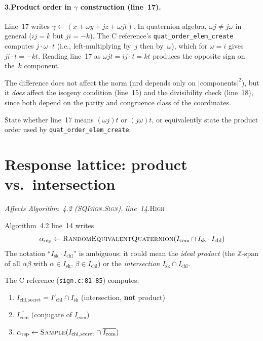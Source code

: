 \documentclass[a4paper,11pt]{article}
\newcommand{\algo}[1]{Algorithm~#1}
\newcommand{\high}{\textsc{\color{BurntOrange}High}}
\newcommand{\finding}[2]{\noindent\textit{#1}\hfill#2\par\smallskip}
\begin{document}
\paragraph{3.\enspace Product order in $\gamma$ construction
(line~17).}
Line~17 writes $\gamma \leftarrow (x + \omega y + jz + \omega jt)$.
In quaternion algebra, $\omega j \neq j\omega$ in general ($ij = k$
but $ji = -k$).  The C reference's
\texttt{quat\_order\_elem\_create} computes $j \cdot \omega \cdot t$
(i.e., left-multiplying by~$j$ then by~$\omega$), which for
$\omega = i$ gives $ji \cdot t = -kt$.  Reading line~17 as
$\omega j t = ij \cdot t = kt$ produces the opposite sign on
the~$k$ component.

The difference does not affect the norm ($\mathrm{nrd}$ depends only
on $|$components$|^2$), but it \emph{does} affect the isogeny
condition (line~15) and the divisibility check (line~18), since both
depend on the parity and congruence class of the coordinates.

State whether line~17 means $(\omega j)t$ or $(j\omega)t$, or
equivalently state the product order used by
\texttt{quat\_order\_elem\_create}.

\section{Response lattice: product vs.\ intersection}
\label{sec:response-lattice}

\finding{Affects \algo{4.2} (\textsc{SQIsign.Sign}),
line~14.}{\high}

\algo{4.2} line~14 writes
\[
  \alpha_{\mathrm{rsp}} \leftarrow
  \textsc{RandomEquivalentQuaternion}(
    \overline{I_{\mathrm{com}}} \cap I_{\mathrm{sk}} \cdot I_{\mathrm{chl}})
\]
The notation ``$I_{\mathrm{sk}} \cdot I_{\mathrm{chl}}$'' is
ambiguous: it could mean the \emph{ideal product} (the $\mathbb{Z}$-span
of all $\alpha\beta$ with $\alpha \in I_{\mathrm{sk}}$,
$\beta \in I_{\mathrm{chl}}$) or the \emph{intersection}
$I_{\mathrm{sk}} \cap I_{\mathrm{chl}}$.

The C reference (\texttt{sign.c:81--85}) computes:
\begin{enumerate}[nosep]
  \item $I_{\mathrm{chl,secret}} = I'_{\mathrm{chl}} \cap
        I_{\mathrm{sk}}$ \quad (intersection, \textbf{not} product)
  \item $\overline{I_{\mathrm{com}}}$ (conjugate of $I_{\mathrm{com}}$)
  \item $\alpha_{\mathrm{rsp}} \leftarrow
        \textsc{Sample}(I_{\mathrm{chl,secret}} \cap
        \overline{I_{\mathrm{com}}})$
\end{enumerate}
\end{document}
